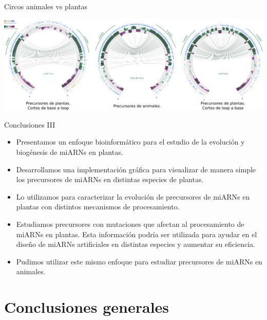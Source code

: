 \documentclass{beamer}
\begin{document}

\begin{frame}{Circos animales vs plantas}
	\begin{center}
		\includegraphics[width=1\textwidth]{img/animals_vs_plants_circos_defensa.png}
	\end{center}
\end{frame}


\begin{frame}{Conclusiones III}
	\begin{itemize}
        \item<1-> Presentamos un enfoque bioinformático para el estudio de la evolución y biogénesis de miARNs en plantas.
        \item<2-> Desarrollamos una implementación gráfica para visualizar de manera simple los precursores de miARNs en distintas especies de plantas.
        \item<3-> Lo utilizamos para caracterizar la evolución de precursores de miARNs en plantas con distintos mecanismos de procesamiento.
        \item<4-> Estudiamos precursores con mutaciones que afectan al procesamiento de miARNs en plantas. 
        Esta información podría ser utilizada para ayudar en el diseño de miARNs artificiales en distintas especies y aumentar su eficiencia.
        \item<5-> Pudimos utilizar este mismo enfoque para estudiar precursores de miARNs en animales.
	\end{itemize}
\end{frame}

\section{Conclusiones generales}
\end{document}
